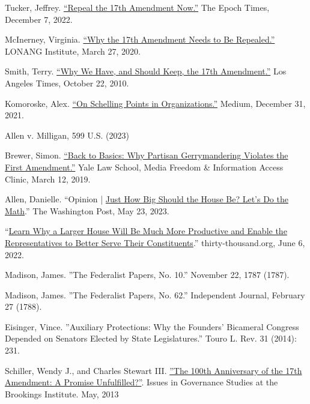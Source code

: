 \documentclass{article}
\begin{document}
\begin{thebibliography}{20}
Tucker, Jeffrey. \href{https://www.theepochtimes.com/repeal-the-17th-amendment-now\_4909126.html}{“Repeal the 17th Amendment Now.”} The Epoch Times, December 7, 2022.

McInerney, Virginia. \href{https://lonang.com/commentaries/conlaw/federalism/repeal-seventeenth-amendment/}{“Why the 17th Amendment Needs to Be Repealed.”} LONANG Institute, March 27, 2020.

Smith, Terry. \href{https://www.latimes.com/archives/la-xpm-2010-oct-22-la-oew-smith-17th-amendment-20101022-story.html}{“Why We Have, and Should Keep, the 17th Amendment.”} Los Angeles Times, October 22, 2010.

Komoroske, Alex. \href{https://medium.com/@komorama/on-schelling-points-in-organizations-e90647cdd81b}{“On Schelling Points in Organizations.”} Medium, December 31, 2021.

Allen v. Milligan, 599 U.S. (2023)

Brewer, Simon. \href{https://law.yale.edu/mfia/case-disclosed/back-basics-why-partisan-gerrymandering-violates-first-amendment. }{“Back to Basics: Why Partisan Gerrymandering Violates the First Amendment.”} Yale Law School, Media Freedom \& Information Access Clinic, March 12, 2019.

Allen, Danielle. “Opinion | \href{https://www.washingtonpost.com/opinions/2023/03/28/danielle-allen-democracy-reform-house-representatives-districts/}{Just How Big Should the House Be? Let’s Do the Math}.” The Washington Post, May 23, 2023. 

“\href{https://thirty-thousand.org/the-house-of-representatives-is-scalable/}{Learn Why a Larger House Will Be Much More Productive and Enable the Representatives to Better Serve Their Constituents}.” thirty-thousand.org, June 6, 2022.

Madison, James. ”The Federalist Papers, No. 10.” November 22, 1787 (1787).

Madison, James. ”The Federalist Papers, No. 62.” Independent Journal, February 27 (1788).

Eisinger, Vince. ”Auxiliary Protections: Why the Founders' Bicameral Congress Depended on Senators Elected by State Legislatures.” Touro L. Rev. 31 (2014): 231.

Schiller, Wendy J., and Charles Stewart III. \href{https://www.brookings.edu/wp-content/uploads/2016/06/Schiller_17th-Amendment_v7.pdf}{”The 100th Anniversary of the 17th Amendment: A Promise Unfulfilled?”}. Issues in Governance Studies at the Brookings Institute. May, 2013


\end{thebibliography}
\end{document}
